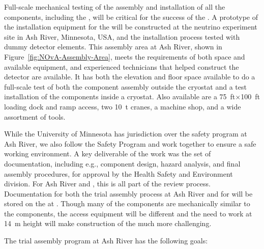 Full-scale mechanical testing of the assembly and installation of all the  components, including the , will be critical for the success of the . %
A prototype of the installation
equipment for the   will be constructed at the  neutrino experiment  site in Ash River, Minnesota, USA, and the installation process tested with dummy detector elements.  
This %
assembly area at Ash River, shown in Figure~\ref{fig:NOvA-Assembly-Area}, meets the requirements of both space %
and available equipment, and %
experienced technicians that helped construct the  detector are available. 
It has both the elevation and floor space available to do a full-scale test of both the component assembly outside the cryostat and a test installation of the  components  inside a %
cryostat. 
Also available are a \SI{75}{ft}$\times$\SI{100}{ft} loading dock and ramp access, two \SI{10}{t} cranes, a machine shop, and a wide assortment of tools. %

While the University of Minnesota has jurisdiction over the safety program at Ash River, we also follow the  Safety Program and work together to ensure a safe working environment.  
A key deliverable of the  work was the set of %
documentation, including e.g.,  %
component design,  hazard analysis, and final assembly procedures, for approval by the  Health Safety and Environment division. 
For Ash River and , this is all part of the  review process. 
Documentation for both the trial assembly process at Ash River and for  will be stored on the  at . 
Though many of the  components are mechanically similar to the  components, the access equipment will be different and the need to work at \SI{14}{m} height will make construction of the  much more challenging.  


The   trial assembly program at Ash River has the following goals:

